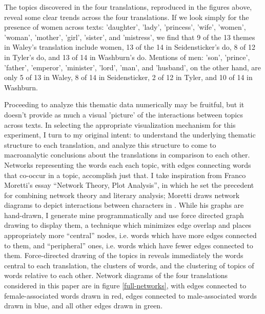 \documentclass[12pt]{article}
\begin{document}
\begin{flushleft}
\begin{spacing}{2.0}
The topics discovered in the four translations, reproduced in the figures above, reveal some clear trends across the four translations. If we look simply for the presence of women across texts: 'daughter', 'lady', 'princess', 'wife', 'women', 'woman', 'mother', 'girl', 'sister', and 'mistress', we find that 9 of the 13 themes in Waley's translation include women, 13 of the 14 in Seidensticker's do, 8 of 12 in Tyler's do, and 13 of 14 in Washburn's do. Mentions of men: 'son', 'prince', 'father', 'emperor', 'minister', 'lord', 'man', and 'husband', on the other hand, are only 5 of 13 in Waley, 8 of 14 in Seidensticker, 2 of 12 in Tyler, and 10 of 14 in Washburn. 

Proceeding to analyze this thematic data numerically may be fruitful, but it doesn't provide as much a visual 'picture' of the interactions between topics across texts. In selecting the appropriate visualization mechanism for this experiment, I turn to my original intent: to understand the underlying thematic structure to each translation, and analyze this structure to come to macroanalytic conclusions about the translations in comparison to each other. Networks representing the words each each topic, with edges connecting words that co-occur in a topic, accomplish just that. I take inspiration from Franco Moretti's essay ``Network Theory, Plot Analysis'', in which he set the precedent for combining network theory and literary analysis; Moretti draws network diagrams to depict interactions between characters in . While his graphs are hand-drawn, I generate mine programmatically and use force directed graph drawing to display them, a technique which minimizes edge overlap and places appropriately more ``central'' nodes, i.e. words which have more edges connected to them, and ``peripheral'' ones, i.e. words which have fewer edges connected to them. Force-directed drawing of the topics in  reveals immediately the words central to each translation, the clusters of words, and the clustering of topics of words relative to each other. Network diagrams of the four translations considered in this paper are in figure \ref{full-networks}, with edges connected to female-associated words drawn in red, edges connected to male-associated words drawn in blue, and all other edges drawn in green.


\end{spacing}
\end{flushleft}
\end{document}
